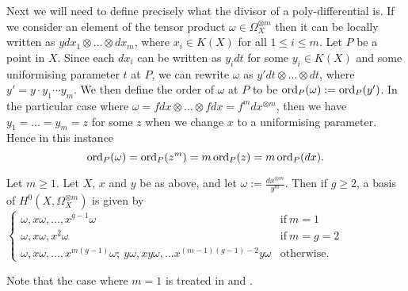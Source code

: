 Next we will need to define precisely what the divisor of a poly-differential is.
If we consider an element of the tensor product $\omega \in \Omega_X^{\otimes m}$ then it can be locally written as $y dx_1\otimes \ldots \otimes dx_m$, where $x_i \in K(X)$ for all $1 \leq i \leq m$.
Let $P$ be a point in $X$.
Since each $dx_i$ can be written as $y_i dt$ for some $y_i\in K(X)$ and some uniformising parameter $t$ at $P$, we can rewrite $\omega$ as $y' dt \otimes \ldots \otimes dt$, where $y' = y \cdot y_1 \cdots y_m$.
We then define the order of $\omega$ at $P$ to be $\operatorname{ord}_P(\omega ) := \operatorname{ord}_P(y')$.
In the particular case where $\omega = fdx \otimes \ldots \otimes fdx = f^m dx^{\otimes m}$, then we have $y_1 = \ldots = y_m = z$ for some $z$ when we change $x$ to a uniformising parameter.
Hence in this instance \[ \operatorname{ord}_P(\omega) = \operatorname{ord}_P(z^m) = m\operatorname{ord}_P(z) = m\operatorname{ord}_P(dx).\]



    \begin{prop}\label{propneq2}
    Let $m\geq 1$.
    Let $X$, $x$ and $y$ be as above, and let $\omega := \frac{dx^{\otimes m}}{y^m}$. 
    Then if $g\geq 2$, a basis of $H^0(X,\Omega_X^{\otimes m})$ is given by
        $\begin{cases}
        \omega, x\omega, \ldots , x^{g-1}\omega &  \mbox{if}\ m=1 \\
        \omega, x\omega, x^2\omega & \mbox{if}\ m=g=2 \\
        \omega, x\omega, \ldots, x^{m(g-1)}\omega;\  y\omega, xy\omega, \ldots x^{(m-1)(g-1)-2}y\omega & \mbox{otherwise.}
        \end{cases}$
    \end{prop}
    
    \begin{rem}
    Note that the case where $m=1$ is treated in \cite[Prop. 7.4.26]{liu} and \cite[Ch. IV, \S 4, Prop. 4.3]{griffiths}.
    \end{rem}
    
